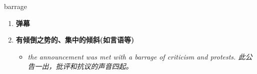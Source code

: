 
\begin{frame}
{\huge barrage}
\begin{center}
\begin{enumerate}\Large
  \item \textbf{弹幕}
  \item \textbf{有倾倒之势的、集中的倾斜(如言语等)}
  \begin{itemize}
    \item \em{\Large{the announcement was met with a barrage of criticism and protests. 此公告一出，批评和抗议的声音四起。}}
  \end{itemize}
\end{enumerate}
\end{center}
\end{frame}
